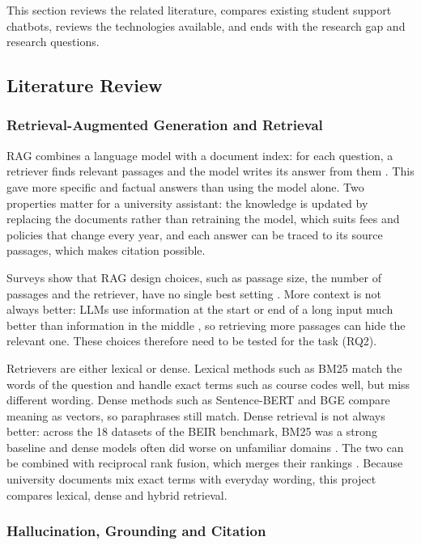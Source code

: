 \documentclass[12pt,nonacm,acmlarge,titlepage,screen]{acmart}
\begin{document}
This section reviews the related literature, compares existing student support chatbots, reviews the technologies available, and ends with the research gap and research questions.

\subsection{Literature Review} \label{sec:back_lit}

\subsubsection{Retrieval-Augmented Generation and Retrieval} \label{sec:back_rag}

RAG combines a language model with a document index: for each question, a retriever finds relevant passages and the model writes its answer from them \cite{lewis2020rag}. This gave more specific and factual answers than using the model alone. Two properties matter for a university assistant: the knowledge is updated by replacing the documents rather than retraining the model, which suits fees and policies that change every year, and each answer can be traced to its source passages, which makes citation possible.

Surveys show that RAG design choices, such as passage size, the number of passages and the retriever, have no single best setting \cite{gao2023rag}. More context is not always better: LLMs use information at the start or end of a long input much better than information in the middle \cite{liu2024lost}, so retrieving more passages can hide the relevant one. These choices therefore need to be tested for the task (RQ2).

Retrievers are either lexical or dense. Lexical methods such as BM25 \cite{robertson2009bm25} match the words of the question and handle exact terms such as course codes well, but miss different wording. Dense methods such as Sentence-BERT \cite{reimers2019sbert} and BGE \cite{xiao2024cpack} compare meaning as vectors, so paraphrases still match. Dense retrieval is not always better: across the 18 datasets of the BEIR benchmark, BM25 was a strong baseline and dense models often did worse on unfamiliar domains \cite{thakur2021beir}. The two can be combined with reciprocal rank fusion, which merges their rankings \cite{cormack2009reciprocal}. Because university documents mix exact terms with everyday wording, this project compares lexical, dense and hybrid retrieval.

\subsubsection{Hallucination, Grounding and Citation} \label{sec:back_halluc}
\end{document}
